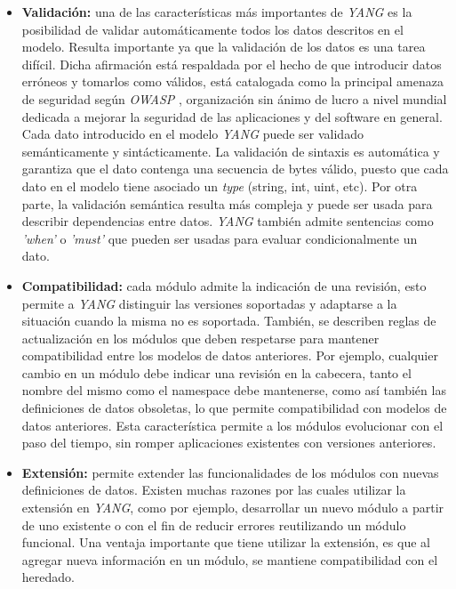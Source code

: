   \begin{itemize}
	\item \textbf{Validación:} una de las características más importantes de \textit{YANG} es la posibilidad de validar automáticamente todos los datos descritos en el modelo. Resulta importante ya que la validación de los datos es una tarea difícil. Dicha afirmación está respaldada por el hecho de que introducir datos erróneos y tomarlos como válidos, está catalogada como la principal amenaza de seguridad según \textit{OWASP} \parencite{owasp}, organización sin ánimo de lucro a nivel mundial dedicada a mejorar la seguridad de las aplicaciones y del software en general. Cada dato introducido en el modelo \textit{YANG} puede ser validado semánticamente y sintácticamente. La validación de sintaxis es automática y garantiza que el dato contenga una secuencia de bytes válido, puesto que cada dato en el modelo tiene asociado un \textit{type} (string, int, uint, etc). Por otra parte, la validación semántica resulta más compleja y puede ser usada para describir dependencias entre datos. \textit{YANG} también admite sentencias como \textit{'when'} o \textit{'must'} que pueden ser usadas para evaluar condicionalmente un dato.  
	\item \textbf{Compatibilidad:} cada módulo admite la indicación de una revisión, esto permite a \textit{YANG} distinguir las versiones soportadas y adaptarse a la situación cuando la misma no es soportada. También, se describen reglas de actualización en los módulos que deben respetarse para mantener compatibilidad entre los modelos de datos anteriores. Por ejemplo, cualquier cambio en un módulo debe indicar una revisión en la cabecera, tanto el nombre del mismo como el namespace debe mantenerse, como así también las definiciones de datos obsoletas, lo que permite compatibilidad con modelos de datos anteriores. Esta característica permite a los módulos evolucionar con el paso del tiempo, sin romper aplicaciones existentes con versiones anteriores.
	\item \textbf{Extensión:} permite extender las funcionalidades de los módulos con nuevas definiciones de datos. Existen muchas razones por las cuales utilizar la extensión en \textit{YANG}, como por ejemplo, desarrollar un nuevo módulo a partir de uno existente o con el fin de reducir errores reutilizando un módulo funcional. Una ventaja importante que tiene utilizar la extensión, es que al agregar nueva información en un módulo, se mantiene compatibilidad con el heredado.
\end{itemize}

